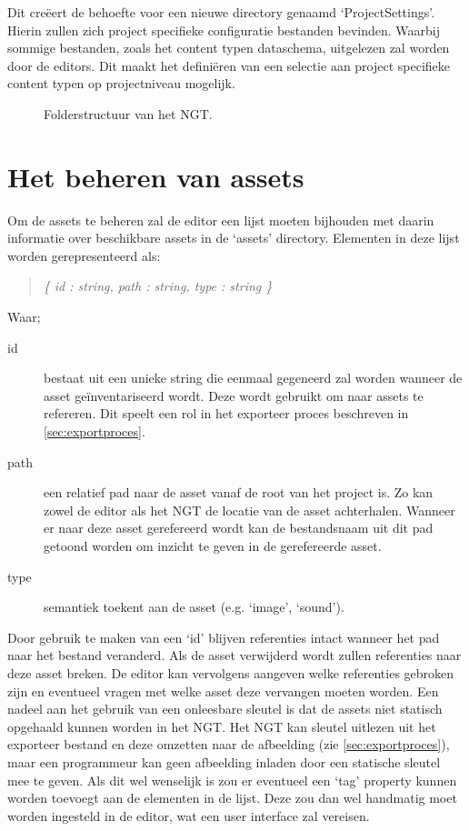 Dit creëert de behoefte voor een nieuwe directory genaamd ‘ProjectSettings’. Hierin zullen zich project specifieke configuratie bestanden bevinden. Waarbij sommige bestanden, zoals het content typen dataschema, uitgelezen zal worden door de editors. Dit maakt het definiëren van een selectie aan project specifieke content typen op projectniveau mogelijk.

\begin{figure}[htb]
    \caption{Folderstructuur van het NGT.}
    \label{fig:ngtfolderstructure}
\end{figure}

\section{Het beheren van assets}
\label{sec:assetmanagement}
Om de assets te beheren zal de editor een lijst moeten bijhouden met daarin informatie over beschikbare assets in de ‘assets’ directory. Elementen in deze lijst worden gerepresenteerd als:
\begin{quote} 
    \centering    
    \textit{
        \{ id : string, path : string, type : string \} 
    }
\end{quote}
\noindent Waar;
\begin{description}
    \item[id] bestaat uit een unieke string die eenmaal gegeneerd zal worden wanneer de asset geïnventariseerd wordt. Deze wordt gebruikt om naar assets te refereren. Dit speelt een rol in het exporteer proces beschreven in \autoref{sec:exportproces}.
    \item[path] een relatief pad naar de asset vanaf de root van het project is. Zo kan zowel de editor als het NGT de locatie van de asset achterhalen. Wanneer er naar deze asset gerefereerd wordt kan de bestandsnaam uit dit pad getoond worden om inzicht te geven in de gerefereerde asset.
    \item[type] semantiek toekent aan de asset (e.g. ‘image’, ‘sound’).
\end{description}

Door gebruik te maken van een ‘id’ blijven referenties intact wanneer het pad naar het bestand veranderd. Als de asset verwijderd wordt zullen referenties naar deze asset breken. De editor kan vervolgens aangeven welke referenties gebroken zijn en eventueel vragen met welke asset deze vervangen moeten worden. Een nadeel aan het gebruik van een onleesbare sleutel is dat de assets niet statisch opgehaald kunnen worden in het NGT. Het NGT kan sleutel uitlezen uit het exporteer bestand en deze omzetten naar de afbeelding (zie \autoref{sec:exportproces}), maar een programmeur kan geen afbeelding inladen door een statische sleutel mee te geven. Als dit wel wenselijk is zou er eventueel een ‘tag’ property kunnen worden toevoegt aan de elementen in de lijst. Deze zou dan wel handmatig moet worden ingesteld in de editor, wat een user interface zal vereisen.


